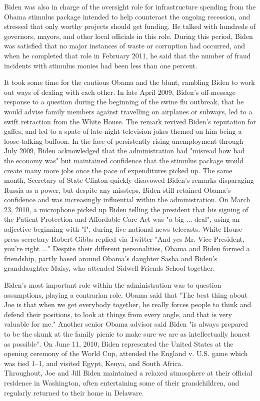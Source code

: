 Biden was also in charge of the oversight role for infrastructure
spending from the Obama stimulus package intended to help counteract the
ongoing recession, and stressed that only worthy projects should get
funding. He talked with hundreds of governors, mayors, and other local
officials in this role. During this period, Biden was satisfied that no
major instances of waste or corruption had occurred, and when he
completed that role in February 2011, he said that the number of fraud
incidents with stimulus monies had been less than one percent.

It took some time for the cautious Obama and the blunt, rambling Biden
to work out ways of dealing with each other. In late April 2009, Biden's
off-message response to a question during the beginning of the swine flu
outbreak, that he would advise family members against travelling on
airplanes or subways, led to a swift retraction from the White House.
The remark revived Biden's reputation for gaffes, and led to a spate of
late-night television jokes themed on him being a loose-talking buffoon.
In the face of persistently rising unemployment through July 2009, Biden
acknowledged that the administration had "misread how bad the economy
was" but maintained confidence that the stimulus package would create
many more jobs once the pace of expenditures picked up. The same month,
Secretary of State Clinton quickly disavowed Biden's remarks disparaging
Russia as a power, but despite any missteps, Biden still retained
Obama's confidence and was increasingly influential within the
administration. On March 23, 2010, a microphone picked up Biden telling
the president that his signing of the Patient Protection and Affordable
Care Act was "a big ... deal", using an adjective beginning with "f",
during live national news telecasts. White House press secretary Robert
Gibbs replied via Twitter "And yes Mr. Vice President, you're right ..."
Despite their different personalities, Obama and Biden formed a
friendship, partly based around Obama's daughter Sasha and Biden's
granddaughter Maisy, who attended Sidwell Friends School together.

Biden's most important role within the administration was to question
assumptions, playing a contrarian role. Obama said that "The best thing
about Joe is that when we get everybody together, he really forces
people to think and defend their positions, to look at things from every
angle, and that is very valuable for me." Another senior Obama advisor
said Biden "is always prepared to be the skunk at the family picnic to
make sure we are as intellectually honest as possible". On June 11,
2010, Biden represented the United States at the opening ceremony of the
World Cup, attended the England v. U.S. game which was tied 1--1, and
visited Egypt, Kenya, and South Africa.\\
Throughout, Joe and Jill Biden maintained a relaxed atmosphere at their
official residence in Washington, often entertaining some of their
grandchildren, and regularly returned to their home in Delaware.

